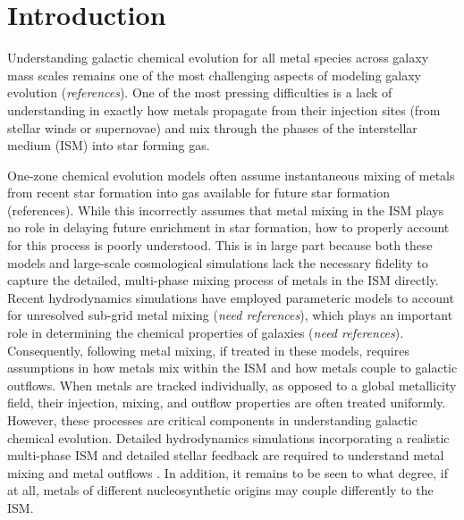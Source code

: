 \documentclass[twocolumn]{aastex61}
\begin{document}
\keywords{}

\section{Introduction}
Understanding galactic chemical evolution for all metal species across galaxy mass scales remains one of the most challenging aspects of modeling galaxy evolution (\textit{references}). One of the most pressing difficulties is a lack of understanding in exactly how metals propagate from their injection sites (from stellar winds or supernovae) and mix through the phases of the interstellar medium (ISM) into star forming gas. 
%
%

One-zone chemical evolution models often assume instantaneous mixing of metals from recent star formation into gas available for future star formation (references). While this incorrectly assumes that metal mixing in the ISM plays no role in delaying future enrichment in star formation, how to properly account for this process is poorly understood. This is in large part because both these models and large-scale cosmological simulations lack the necessary fidelity to capture the detailed, multi-phase mixing process of metals in the ISM directly. Recent hydrodynamics simulations have employed parameteric models to account for unresolved sub-grid metal mixing (\textit{need references}), which plays an important role in determining the chemical properties of galaxies (\textit{need references}). Consequently, following metal mixing, if treated in these models, requires assumptions in how metals mix within the ISM and how metals couple to galactic outflows. When metals are tracked individually, as opposed to a global metallicity field, their injection, mixing, and outflow properties are often treated uniformly. However, these processes are critical components in understanding galactic chemical evolution. Detailed hydrodynamics simulations incorporating a realistic multi-phase ISM and detailed stellar feedback are required to understand metal mixing and metal outflows \citep[e.g.][]{Armillotta2018}. In addition, it remains to be seen to what degree, if at all, metals of different nucleosynthetic origins may couple differently to the ISM. 
\end{document}
